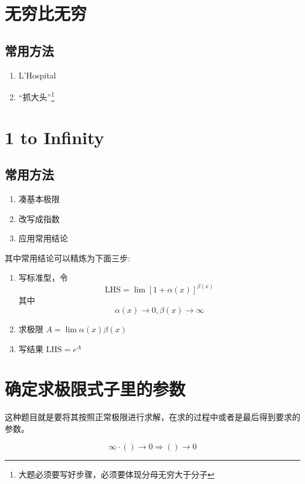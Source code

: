 \section{无穷比无穷}

\subsection{常用方法}

\begin{enumerate}
	\item L'Hospital
	\item “抓大头”\footnote{大题必须要写好步骤，必须要体现分母无穷大于分子}
\end{enumerate}

\section{1 to Infinity}
\subsection{常用方法}
\begin{enumerate}
	\item 凑基本极限
	\item 改写成指数
	\item 应用常用结论
\end{enumerate}

其中常用结论可以精炼为下面三步:
\begin{enumerate}
	\item 写标准型，令
	\[\mbox{LHS} = \lim{} \left[ 1+\alpha(x)\right] ^{\beta(x)}\]
	其中 \[\alpha(x)\to0, \beta(x)\to\infty\]
	\item 求极限 $A = \lim \alpha(x)\beta(x)$
	\item 写结果 $\mbox{LHS} = e^{A}$
\end{enumerate}

\section{确定求极限式子里的参数}

这种题目就是要将其按照正常极限进行求解，在求的过程中或者是最后得到要求的参数。

\begin{lemma} \label{lm:inf-zero-zero}
	\begin{equation}
		\infty \cdot () \to 0 \Rightarrow () \to 0
	\end{equation}

\end{lemma}

